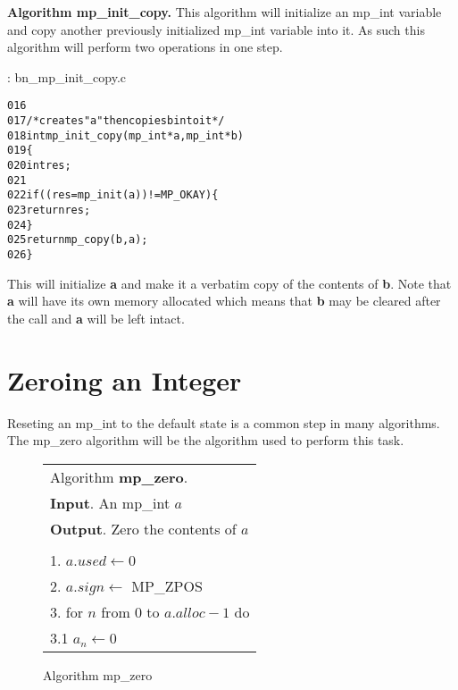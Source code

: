 \documentclass[b5paper]{book}
\begin{document}
\textbf{Algorithm mp\_init\_copy.}
This algorithm will initialize an mp\_int variable and copy another previously initialized mp\_int variable into it.  As 
such this algorithm will perform two operations in one step.  

\vspace{+3mm}\begin{small}
\hspace{-5.1mm}{\bf File}: bn\_mp\_init\_copy.c
\vspace{-3mm}
\begin{alltt}
016   
017   /* creates "a" then copies b into it */
018   int mp_init_copy (mp_int * a, mp_int * b)
019   \{
020     int     res;
021   
022     if ((res = mp_init (a)) != MP_OKAY) \{
023       return res;
024     \}
025     return mp_copy (b, a);
026   \}
\end{alltt}
\end{small}

This will initialize \textbf{a} and make it a verbatim copy of the contents of \textbf{b}.  Note that 
\textbf{a} will have its own memory allocated which means that \textbf{b} may be cleared after the call
and \textbf{a} will be left intact.  

\section{Zeroing an Integer}
Reseting an mp\_int to the default state is a common step in many algorithms.  The mp\_zero algorithm will be the algorithm used to
perform this task.

\begin{figure}[here]
\begin{center}
\begin{tabular}{l}
\hline Algorithm \textbf{mp\_zero}. \\
\textbf{Input}.   An mp\_int $a$ \\
\textbf{Output}.  Zero the contents of $a$ \\
\hline \\
1.  $a.used \leftarrow 0$ \\
2.  $a.sign \leftarrow$ MP\_ZPOS \\
3.  for $n$ from 0 to $a.alloc - 1$ do \\
\hspace{3mm}3.1  $a_n \leftarrow 0$ \\
\hline
\end{tabular}
\end{center}
\caption{Algorithm mp\_zero}
\end{figure}
\end{document}
